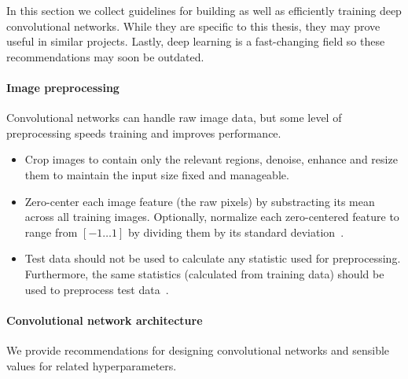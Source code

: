 In this section we collect guidelines for building as well as efficiently training deep convolutional networks. While they are specific to this thesis, they may prove useful in similar projects. Lastly, deep learning is a fast-changing field so these recommendations may soon be outdated.

\paragraph{Image preprocessing} Convolutional networks can handle raw image data, but some level of preprocessing speeds training and improves performance.
\begin{itemize}
	\item Crop images to contain only the relevant regions, denoise, enhance and resize them to maintain the input size fixed and manageable.

	\item Zero-center each image feature (the raw pixels) by substracting its mean across all training images. Optionally, normalize each zero-centered feature to range from $[-1 \dots 1]$ by dividing them by its standard deviation~\cite{Karpathy2015}.

	\item Test data should not be used to calculate any statistic used for preprocessing. Furthermore, the same statistics (calculated from training data) should be used to preprocess test data~\cite{Karpathy2015}.
\end{itemize}



\paragraph{Convolutional network architecture} We provide recommendations for designing convolutional networks and sensible values for related hyperparameters.

